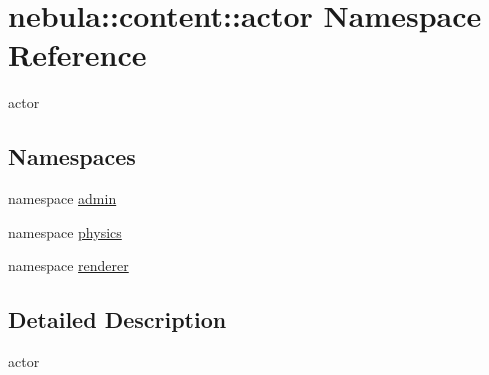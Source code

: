 \hypertarget{namespacenebula_1_1content_1_1actor}{
\section{nebula::content::actor Namespace Reference}
\label{namespacenebula_1_1content_1_1actor}
}


actor  
\subsection*{Namespaces}
\begin{DoxyCompactItemize}
\item 
namespace \hyperlink{namespacenebula_1_1content_1_1actor_1_1admin}{admin}
\item 
namespace \hyperlink{namespacenebula_1_1content_1_1actor_1_1physics}{physics}
\item 
namespace \hyperlink{namespacenebula_1_1content_1_1actor_1_1renderer}{renderer}
\end{DoxyCompactItemize}


\subsection{Detailed Description}
actor 